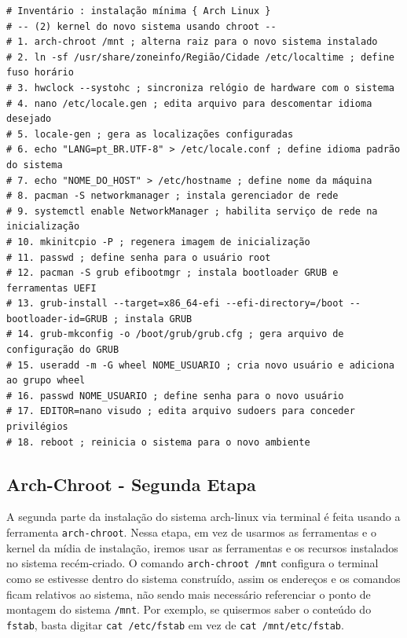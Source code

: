 \documentclass[12pt,a4paper]{article}
\begin{document}
\begin{lstlisting}
# Inventário : instalação mínima { Arch Linux }
# -- (2) kernel do novo sistema usando chroot --
# 1. arch-chroot /mnt ; alterna raiz para o novo sistema instalado
# 2. ln -sf /usr/share/zoneinfo/Região/Cidade /etc/localtime ; define fuso horário
# 3. hwclock --systohc ; sincroniza relógio de hardware com o sistema
# 4. nano /etc/locale.gen ; edita arquivo para descomentar idioma desejado
# 5. locale-gen ; gera as localizações configuradas
# 6. echo "LANG=pt_BR.UTF-8" > /etc/locale.conf ; define idioma padrão do sistema
# 7. echo "NOME_DO_HOST" > /etc/hostname ; define nome da máquina
# 8. pacman -S networkmanager ; instala gerenciador de rede
# 9. systemctl enable NetworkManager ; habilita serviço de rede na inicialização
# 10. mkinitcpio -P ; regenera imagem de inicialização
# 11. passwd ; define senha para o usuário root
# 12. pacman -S grub efibootmgr ; instala bootloader GRUB e ferramentas UEFI
# 13. grub-install --target=x86_64-efi --efi-directory=/boot --bootloader-id=GRUB ; instala GRUB
# 14. grub-mkconfig -o /boot/grub/grub.cfg ; gera arquivo de configuração do GRUB
# 15. useradd -m -G wheel NOME_USUARIO ; cria novo usuário e adiciona ao grupo wheel
# 16. passwd NOME_USUARIO ; define senha para o novo usuário
# 17. EDITOR=nano visudo ; edita arquivo sudoers para conceder privilégios
# 18. reboot ; reinicia o sistema para o novo ambiente
\end{lstlisting}

\subsection{Arch-Chroot - Segunda Etapa}

\hspace{\baselineskip}

A segunda parte da instalação do sistema arch-linux via terminal é feita usando a ferramenta \texttt{arch-chroot}. Nessa etapa, em vez de usarmos as ferramentas e o kernel da mídia de instalação, iremos usar as ferramentas e os recursos instalados no sistema recém-criado. O comando \texttt{arch-chroot /mnt} configura o terminal como se estivesse dentro do sistema construído, assim os endereços e os comandos ficam relativos ao sistema, não sendo mais necessário referenciar o ponto de montagem do sistema \texttt{/mnt}. Por exemplo, se quisermos saber o conteúdo do \texttt{fstab}, basta digitar \texttt{cat /etc/fstab} em vez de \texttt{cat /mnt/etc/fstab}. \\
\end{document}

